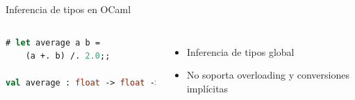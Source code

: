\documentclass[aspectratio=169,10pt]{beamer}
\begin{document}
\begin{frame}[fragile]{Inferencia de tipos en OCaml}
	\begin{columns}[T,onlytextwidth]
\begin{lstlisting}[language=ML,basicstyle=\fontsize{9}{9}\ttfamily]
# let average a b =
    (a +. b) /. 2.0;;

val average : float -> float -> float
\end{lstlisting} \pause
{}
\begin{itemize}
	\item Inferencia de tipos global \pause
	\item No soporta overloading y conversiones implícitas
\end{itemize}
	\end{columns}
\end{frame}
%
%
%
%
\end{document}
